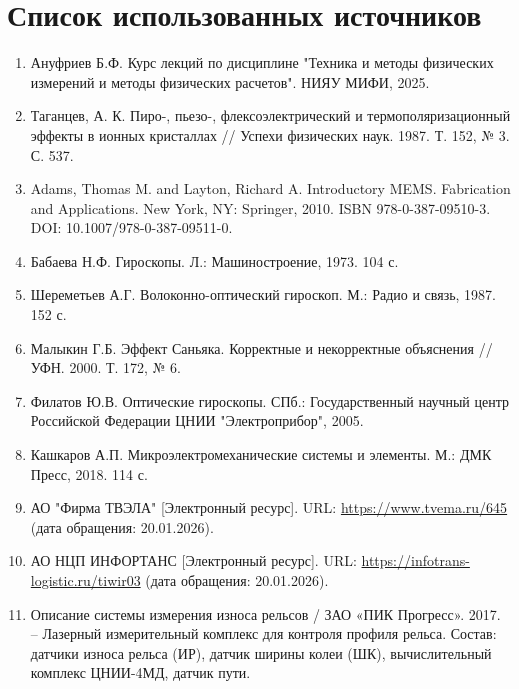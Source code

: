 \chapter*{Список использованных источников}

\begin{enumerate}
	\item Ануфриев Б.Ф. Курс лекций по дисциплине "Техника и методы физических измерений и методы физических расчетов". НИЯУ МИФИ, 2025.
	
	\item Таганцев, А. К. Пиро-, пьезо-, флексоэлектрический и термополяризационный эффекты в ионных кристаллах // Успехи физических наук. 1987. Т. 152, № 3. С. 537.
	
	\item Adams, Thomas M. and Layton, Richard A. Introductory MEMS. Fabrication and Applications. New York, NY: Springer, 2010. ISBN 978-0-387-09510-3. DOI: 10.1007/978-0-387-09511-0.

	\item Бабаева Н.Ф. Гироскопы. Л.: Машиностроение, 1973. 104 с.
	
	\item Шереметьев А.Г. Волоконно-оптический гироскоп. М.: Радио и связь, 1987. 152 с.
	
	\item Малыкин Г.Б. Эффект Саньяка. Корректные и некорректные объяснения // УФН. 2000. Т. 172, № 6.

	\item Филатов Ю.В. Оптические гироскопы. СПб.: Государственный научный центр Российской Федерации ЦНИИ "Электроприбор", 2005.
	
	\item Кашкаров А.П. Микроэлектромеханические системы и элементы. М.: ДМК Пресс, 2018. 114 с.

	\item АО "Фирма ТВЭЛА" [Электронный ресурс]. URL: \url{https://www.tvema.ru/645} (дата обращения: 20.01.2026).
	
	\item АО НЦП ИНФОРТАНС [Электронный ресурс]. URL: \url{https://infotrans-logistic.ru/tiwir03} (дата обращения: 20.01.2026).
	
	\item Описание системы измерения износа рельсов / ЗАО «ПИК Прогресс». 2017. – Лазерный измерительный комплекс для контроля профиля рельса. Состав: датчики износа рельса (ИР), датчик ширины колеи (ШК), вычислительный комплекс ЦНИИ-4МД, датчик пути.
\end{enumerate}